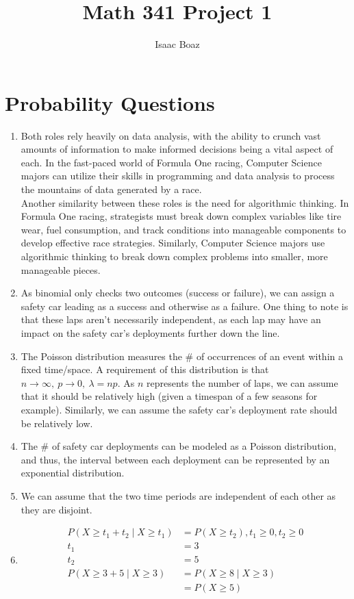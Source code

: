 \documentclass{article}
\title{\vspace{-4ex}Math 341 Project 1}
\author{Isaac Boaz}
\begin{document}
\maketitle

\section*{Probability Questions}

\begin{enumerate}
    \item Both roles rely heavily on data analysis, with the ability to crunch vast amounts of information to make informed decisions being a vital aspect of each. In the fast-paced world of Formula One racing, Computer Science majors can utilize their skills in programming and data analysis to process the mountains of data generated by a race. \\
          Another similarity between these roles is the need for algorithmic thinking. In Formula One racing, strategists must break down complex variables like tire wear, fuel consumption, and track conditions into manageable components to develop effective race strategies. Similarly, Computer Science majors use algorithmic thinking to break down complex problems into smaller, more manageable pieces.
    \item As binomial only checks two outcomes (success or failure), we can assign a safety car leading as a success and otherwise as a failure. One thing to note is that these laps aren't necessarily independent, as each lap may have an impact on the safety car's deployments further down the line.
    \item The Poisson distribution measures the \# of occurrences of an event within a fixed time/space. A requirement of this distribution is that \(n \rightarrow \infty,\ p \rightarrow 0,\ \lambda = np\). As \(n\) represents the number of laps, we can assume that it should be relatively high (given a timespan of a few seasons for example). Similarly, we can assume the safety car's deployment rate should be relatively low.
    \item The \# of safety car deployments can be modeled as a Poisson distribution, and thus, the interval between each deployment can be represented by an exponential distribution.
    \item We can assume that the two time periods are independent of each other as they are disjoint.
    \item
          \begin{align*}
              P(X \geq t_1 + t_2 \mid X \geq t_1) & = P(X \geq t_2), t_1 \geq 0, t_2 \geq 0 \\
              t_1                                 & = 3                                     \\
              t_2                                 & = 5                                     \\
              P(X \geq 3 + 5 \mid X \geq 3)       & = P(X \geq 8 \mid X \geq 3)             \\
                                                  & = P(X \geq 5)
          \end{align*}


\end{enumerate}
\end{document}
